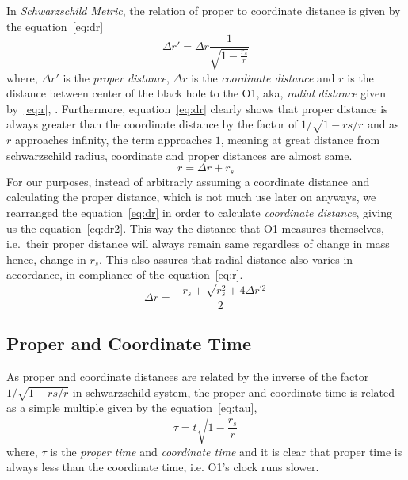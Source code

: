 In \emph{Schwarzschild Metric}, the relation of proper to coordinate distance is given by the equation~\ref{eq:dr}
\begin{equation}\label{eq:dr}
    \Delta r' = \Delta r \frac{1}{\sqrt{1 - \frac{r_s}{r}}} \tag{3.8}
\end{equation}
where, \(\Delta r'\) is the \emph{proper distance}, \(\Delta r\) is the \emph{coordinate distance} and 
\(r\) is the distance between center of the black hole to the O1, aka, \emph{radial distance} given by~\ref{eq:r}, . Furthermore, equation~\ref{eq:dr} clearly shows
that proper distance is always greater than the coordinate distance by the factor of \(1/ \sqrt{1 - rs/r}\) and as \(r\) approaches infinity, the term
approaches \(1\), meaning at great distance from schwarzschild radius, coordinate and proper distances are almost same. 
\begin{equation}\label{eq:r}
    r = \Delta r + r_s \tag{3.9}
\end{equation}
For our purposes, instead of arbitrarly assuming a coordinate distance and calculating the proper distance, which is not much use later on anyways,
we rearranged the equation~\ref{eq:dr} in order to calculate \emph{coordinate distance}, giving us the equation~\ref{eq:dr2}. This way the distance that O1 
measures themselves, i.e.~their proper distance will always remain same regardless of change in mass hence, change in \(r_s\). This also assures that radial 
distance also varies in accordance, in compliance of the equation~\ref{eq:r}.
\begin{equation}\label{eq:dr2}
    \Delta r = \frac{-r_s + \sqrt{r_s^2 + 4 \Delta r^{'2}}}{2} \tag{3.10}
\end{equation}
\subsection{Proper and Coordinate Time}\label{subsec:pt_ct}

As proper and coordinate distances are related by the inverse of the factor \(1/ \sqrt{1 - rs/r}\) in schwarzschild system, the proper and coordinate time 
is related as a simple multiple given by the equation~\ref{eq:tau},
\begin{equation}\label{eq:tau}
    \tau = t \sqrt{1 - \frac{r_s}{r}} \tag{3.11}
\end{equation}
where, \(\tau\) is the \emph{proper time} and \emph{coordinate time} and it is clear that proper time is always less than the coordinate time, 
i.e. O1's clock runs slower. 

